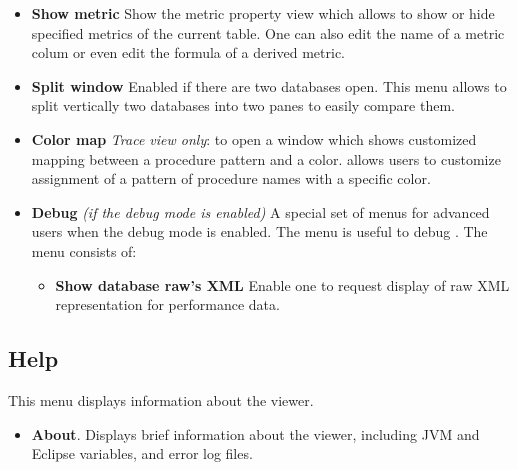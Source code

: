 \documentclass[english]{article}
\begin{document}
\begin{itemize}
 \item \textbf{Show metric}
Show the metric property view which allows to show or hide specified metrics of the current table.
One can also edit the name of a metric colum or even edit the formula of a derived metric.

 \item \textbf{Split window}
 Enabled if there are two databases open. This menu allows to split vertically two databases into two panes to easily compare them.

 \item \textbf{Color map} \emph{Trace view only}: to open a window which shows customized mapping between a procedure pattern and a color.  allows users to customize assignment of a pattern of procedure names with a specific color.

 \item \textbf{Debug} \emph{(if the debug mode is enabled)}
 A special set of menus for advanced users when the debug mode is enabled. The menu is useful to debug . The menu consists of:

   \begin{itemize}
     \item \textbf{Show database raw's XML}
 	Enable one to request display of raw XML representation for performance data.
  \end{itemize}

\end{itemize}


\subsection{Help}

This menu displays information about the viewer. 
\begin{itemize}

\item \textbf{About}.
  Displays brief information about the viewer, including JVM and Eclipse variables, and error log files.

\end{itemize}



\end{document}
